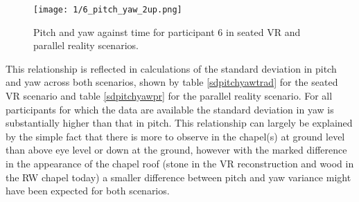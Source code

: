 \begin{figure}[h]
	\begin{center}
	\texttt{[image: 1/6\_pitch\_yaw\_2up.png]}
	\caption{Pitch and yaw against time for participant 6 in seated VR and parallel reality scenarios.}
	\label{6_pitch_yaw_2up.png}
	\end{center}
\end{figure}

This relationship is reflected in calculations of the standard deviation in pitch and yaw across both scenarios, shown by table \ref{sdpitchyawtrad} for the seated VR scenario and table \ref{sdpitchyawpr} for the parallel reality scenario. For all participants for which the data are available the standard deviation in yaw is substantially higher than that in pitch. This relationship can largely be explained by the simple fact that there is more to observe in the chapel(s) at ground level than above eye level or down at the ground, however with the marked difference in the appearance of the chapel roof (stone in the VR reconstruction and wood in the RW chapel today) a smaller difference between pitch and yaw variance might have been expected for both scenarios.

